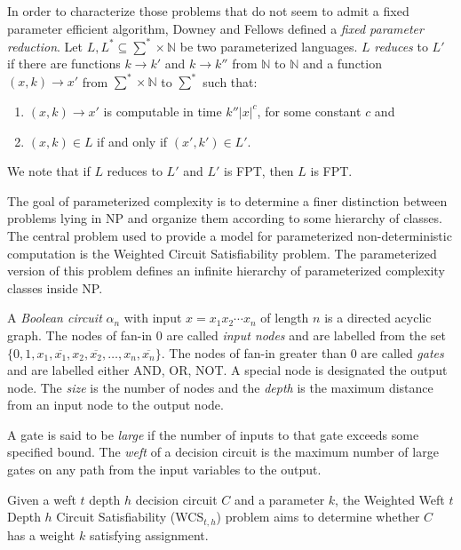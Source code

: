 In order to characterize those problems that do not seem to admit a fixed parameter efficient algorithm, Downey and Fellows \cite{DF99} defined a {\em fixed parameter reduction}. Let $L, L^* \subseteq \sum^* \times \mathbb{N}$ be two parameterized languages. $L$ {\em reduces} to $L'$ if there are functions $k \rightarrow k'$ and $k \rightarrow k''$ from $\mathbb{N}$ to $\mathbb{N}$ and a function $(x, k) \rightarrow x'$ from $\sum^* \times  \mathbb{N}$ to $\sum^*$ such that:
\begin{enumerate}
\item $(x, k) \rightarrow x'$ is computable in time $k''|x|^c$, for some constant $c$ and
\item $(x,k) \in L$ if and only if $(x', k') \in L'$.
\end{enumerate}

\noindent We note that if $L$ reduces to $L'$ and $L'$ is FPT, then $L$ is FPT.

The goal of parameterized complexity is to determine a finer distinction between problems lying in NP and organize them according to some hierarchy of classes.  The central problem used to provide a model for parameterized non-deterministic computation is the {\sc Weighted Circuit Satisfiability} problem.  The parameterized version of this problem defines an infinite hierarchy of parameterized complexity classes inside NP.  

\begin{definition} A {\em Boolean circuit} $\alpha_n$ with input $x = x_1x_2 \cdots x_n$ of length $n$ is a directed acyclic graph.  The nodes of fan-in 0 are called {\em input nodes} and are labelled from the set $\{0, 1, x_1, \overline{x_1}, x_2, \overline{x_2}, \ldots, x_n, \overline{x_n}\}$.  The nodes of fan-in greater than 0 are called {\em gates} and are labelled either AND, OR, NOT.  A special node is designated the output node.  The {\em size} is the number of nodes and the {\em depth} is the maximum distance from an input node to the output node. \end{definition}

\begin{definition} A gate is said to be {\em large} if the number of inputs to that gate exceeds some specified bound.  The {\em weft} of a decision circuit is the maximum number of large gates on any path from the input variables to the output. \end{definition}

\begin{definition} Given a weft $t$ depth $h$ decision circuit $C$ and a parameter $k$, the {\sc Weighted Weft} $t$ {\sc Depth} $h$ {\sc Circuit Satisfiability (WCS$_{t,h}$)} problem aims to determine whether $C$ has a weight $k$ satisfying assignment. \end{definition}

